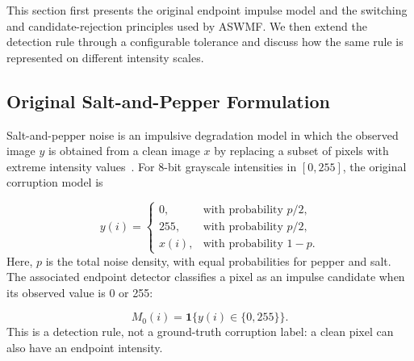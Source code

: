 \documentclass[pdflatex,iicol,sn-mathphys-num]{sn-jnl}
\newif\ifshowportuguese
\newcommand{\pt}[1]{\ifshowportuguese\par\begingroup\small\color{blue!55!black}\noindent\textbf{PT: }#1\par\endgroup\fi}
\begin{document}
This section first presents the original endpoint impulse model and the switching and candidate-rejection principles used by ASWMF. We then extend the detection rule through a configurable tolerance and discuss how the same rule is represented on different intensity scales.
\pt{Esta seção apresenta primeiro o modelo original de impulsos nos extremos e os princípios de chaveamento e rejeição de candidatos usados pelo ASWMF. Em seguida, estendemos a regra de detecção por meio de uma tolerância configurável e discutimos como a mesma regra é representada em diferentes escalas de intensidade.}

\subsection{Original Salt-and-Pepper Formulation}
\label{subsec:strict_impulse_model}

Salt-and-pepper noise is an impulsive degradation model in which the observed image $y$ is obtained from a clean image $x$ by replacing a subset of pixels with extreme intensity values~\cite{esakkirajan2011removal}. For 8-bit grayscale intensities in $[0,255]$, the original corruption model is
\pt{O ruído sal-e-pimenta é um modelo de degradação impulsiva no qual a imagem observada $y$ é obtida de uma imagem limpa $x$ pela substituição de um subconjunto de pixels por valores extremos de intensidade~\cite{esakkirajan2011removal}. Para intensidades em tons de cinza de 8 bits em $[0,255]$, o modelo original de corrupção é}
\begin{equation}
y(i)=\begin{cases}
0, & \text{with probability }p/2,\\
255, & \text{with probability }p/2,\\
x(i), & \text{with probability }1-p.
\end{cases}
\label{eq:sp_model}
\end{equation}
Here, $p$ is the total noise density, with equal probabilities for pepper and salt. The associated endpoint detector classifies a pixel as an impulse candidate when its observed value is 0 or 255:
\pt{Aqui, $p$ é a densidade total de ruído, com probabilidades iguais para pimenta e sal. O detector associado aos extremos classifica um pixel como candidato a impulso quando seu valor observado é 0 ou 255:}
\begin{equation}
M_0(i)=\mathbf{1}\{y(i)\in\{0,255\}\}.
\label{eq:strict_impulse_mask}
\end{equation}
This is a detection rule, not a ground-truth corruption label: a clean pixel can also have an endpoint intensity.
\pt{Essa é uma regra de detecção, e não um rótulo verdadeiro de corrupção: um pixel limpo também pode ter intensidade em um dos extremos.}
\end{document}
